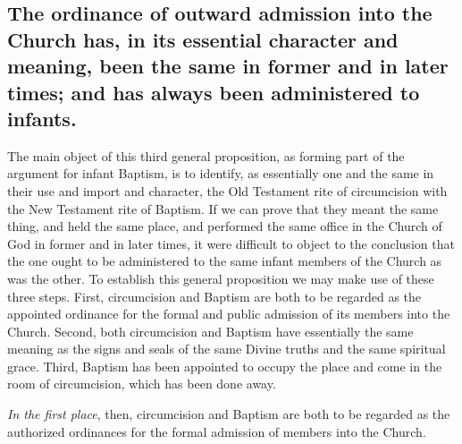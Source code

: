 \documentclass[english,]{book}
\begin{document}
\hypertarget{the-ordinance-of-outward-admission-into-the-church-has-in-its-essential-character-and-meaning-been-the-same-in-former-and-in-later-times-and-has-always-been-administered-to-infants.}{%
\subsection{The ordinance of outward admission into the Church has, in its essential character and meaning, been the same in former and in later times; and has always been administered to infants.}\label{the-ordinance-of-outward-admission-into-the-church-has-in-its-essential-character-and-meaning-been-the-same-in-former-and-in-later-times-and-has-always-been-administered-to-infants.}}

The main object of this third general proposition, as forming part of the argument for infant Baptism, is to identify, as essentially one and the same in their use and import and character, the Old Testament rite of circumcision with the New Testament rite of Baptism. If we can prove that they meant the same thing, and held the same place, and performed the same office in the Church of God in former and in later times, it were difficult to object to the conclusion that the one ought to be administered to the same infant members of the Church as was the other. To establish this general proposition we may make use of these three steps. First, circumcision and Baptism are both to be regarded as the appointed ordinance for the formal and public admission of its members into the Church. Second, both circumcision and Baptism have essentially the same meaning as the signs and seals of the same Divine truths and the same spiritual grace. Third, Baptism has been appointed to occupy the place and come in the room of circumcision, which has been done away.

\emph{In the first place}, then, circumcision and Baptism are both to be regarded as the authorized ordinances for the formal admission of members into the Church.
\end{document}
